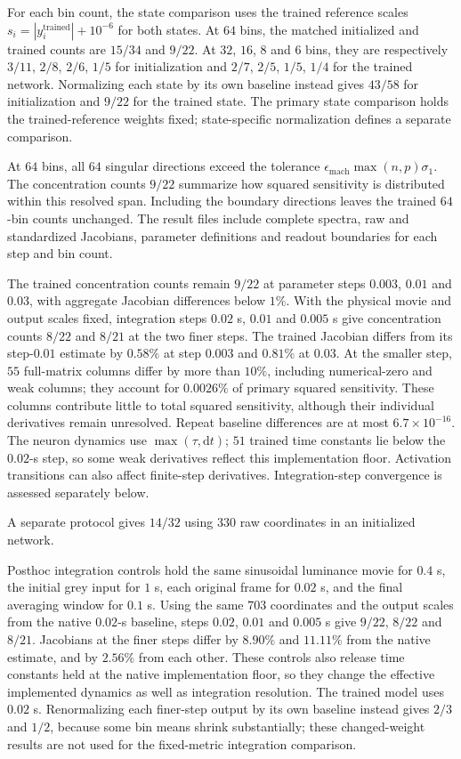 \documentclass[11pt,letterpaper]{article}
\begin{document}
For each bin count, the state comparison uses the trained reference scales $s_i=|y_i^{\mathrm{trained}}|+10^{-6}$ for both states. At $64$ bins, the matched initialized and trained counts are $15/34$ and $9/22$. At $32$, $16$, $8$ and $6$ bins, they are respectively $3/11$, $2/8$, $2/6$, $1/5$ for initialization and $2/7$, $2/5$, $1/5$, $1/4$ for the trained network. Normalizing each state by its own baseline instead gives $43/58$ for initialization and $9/22$ for the trained state. The primary state comparison holds the trained-reference weights fixed; state-specific normalization defines a separate comparison.

At $64$ bins, all $64$ singular directions exceed the tolerance $\epsilon_{\mathrm{mach}}\max(n,p)\sigma_1$. The concentration counts $9/22$ summarize how squared sensitivity is distributed within this resolved span. Including the boundary directions leaves the trained $64$-bin counts unchanged. The result files include complete spectra, raw and standardized Jacobians, parameter definitions and readout boundaries for each step and bin count.

The trained concentration counts remain $9/22$ at parameter steps $0.003$, $0.01$ and $0.03$, with aggregate Jacobian differences below $1\%$. With the physical movie and output scales fixed, integration steps $0.02$ s, $0.01$ and $0.005$ s give concentration counts $8/22$ and $8/21$ at the two finer steps. The trained Jacobian differs from its step-$0.01$ estimate by $0.58\%$ at step $0.003$ and $0.81\%$ at $0.03$. At the smaller step, $55$ full-matrix columns differ by more than $10\%$, including numerical-zero and weak columns; they account for $0.0026\%$ of primary squared sensitivity. These columns contribute little to total squared sensitivity, although their individual derivatives remain unresolved. Repeat baseline differences are at most $6.7\times10^{-16}$. The neuron dynamics use $\max(\tau,\mathrm{d}t)$; $51$ trained time constants lie below the $0.02$-s step, so some weak derivatives reflect this implementation floor. Activation transitions can also affect finite-step derivatives. Integration-step convergence is assessed separately below.

A separate protocol gives $14/32$ using $330$ raw coordinates in an initialized network.

Posthoc integration controls hold the same sinusoidal luminance movie for $0.4$ s, the initial grey input for $1$ s, each original frame for $0.02$ s, and the final averaging window for $0.1$ s. Using the same $703$ coordinates and the output scales from the native $0.02$-s baseline, steps $0.02$, $0.01$ and $0.005$ s give $9/22$, $8/22$ and $8/21$. Jacobians at the finer steps differ by $8.90\%$ and $11.11\%$ from the native estimate, and by $2.56\%$ from each other. These controls also release time constants held at the native implementation floor, so they change the effective implemented dynamics as well as integration resolution. The trained model uses $0.02$ s. Renormalizing each finer-step output by its own baseline instead gives $2/3$ and $1/2$, because some bin means shrink substantially; these changed-weight results are not used for the fixed-metric integration comparison.
\end{document}
